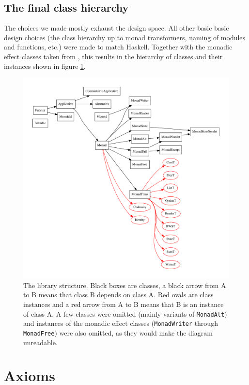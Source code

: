 \documentclass[declaration,inz,english,shortabstract]{iithesis}
\newcommand{\m}[1]{\texttt{#1}}
\begin{document}
\subsection{The final class hierarchy}

The choices we made mostly exhaust the design space. All other basic basic design choices (the class hierarchy up to monad transformers, naming of modules and functions, etc.) were made to match Haskell. Together with the monadic effect classes taken from \cite{JustDoIt}, this results in the hierarchy of classes and their instances shown in figure \ref{fig:hierarchy}.

\begin{figure}
    \centerline{\includegraphics[width=20cm]{Hierarchy.pdf}}
    \caption{The library structure. Black boxes are classes, a black arrow from A to B means that class B depends on class A. Red ovals are class instances and a red arrow from A to B means that B is an instance of class A. A few classes were omitted (mainly variants of \m{MonadAlt}) and instances of the monadic effect classes (\m{MonadWriter} through \m{MonadFree}) were also omitted, as they would make the diagram unreadable.}
    \label{fig:hierarchy}
\end{figure}

\section{Axioms}
\end{document}
